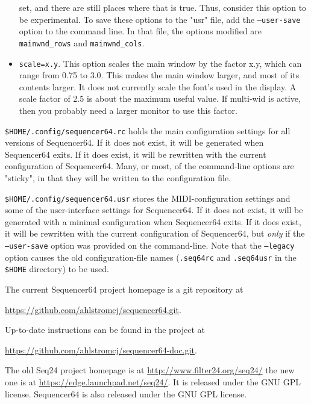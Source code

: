 \begin{itemize}
            set, and there are still places where that is true.  Thus,
            consider this option to be experimental.
            To save these options to the "usr" file, add the
            \texttt{--user-save} option to the command line.
            In that file, the options modified are \texttt{mainwnd\_rows} and
            \texttt{mainwnd\_cols}.
         \item \texttt{scale=x.y}.
            This option scales the main window by the factor x.y, which can
            range from 0.75 to 3.0.  This makes the main window larger, and
            most of its contents larger.  It does not currently scale the
            font's used in the display.  A scale factor of 2.5 is about the
            maximum useful value.  If multi-wid is active, then you probably
            need a larger monitor to use this factor.
      \end{itemize}

   \texttt{\$HOME/.config/sequencer64.rc} holds the main configuration settings
   for all versions of Sequencer64.  If it does not exist, it will be generated
   when Sequencer64 exits.  If it does exist, it will be rewritten with the
   current configuration of Sequencer64.  Many, or most, of the command-line
   options are "sticky", in that they will be written to the configuration
   file.

   \texttt{\$HOME/.config/sequencer64.usr} stores the MIDI-configuration
   settings and some of the user-interface settings for Sequencer64.  If it
   does not exist, it will be generated with a minimal configuration when
   Sequencer64 exits.  If it does exist, it will be rewritten with the current
   configuration of Sequencer64, but \textsl{only} if the
   \texttt{--user-save} option was provided on the command-line.
   Note that the
   \texttt{--legacy} option causes the old
   configuration-file names (\texttt{.seq64rc} and \texttt{.seq64usr}
   in the \texttt{\$HOME} directory)
   to be used.

   The current Sequencer64 project homepage is a git repository at

   \url{https://github.com/ahlstromcj/sequencer64.git}.

   Up-to-date instructions can be found in the project at

   \url{https://github.com/ahlstromcj/sequencer64-doc.git}.

   The old Seq24 project homepage is at
   \url{http://www.filter24.org/seq24/} the new
   one is at \url{https://edge.launchpad.net/seq24/}.
   It is released under the GNU GPL license.
   Sequencer64 is also released under the GNU GPL license.

